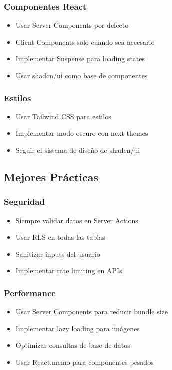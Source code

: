 \documentclass[12pt,a4paper]{article}
\begin{document}
\subsubsection{Componentes React}
\begin{itemize}
    \item Usar Server Components por defecto
    \item Client Components solo cuando sea necesario
    \item Implementar Suspense para loading states
    \item Usar shadcn/ui como base de componentes
\end{itemize}

\subsubsection{Estilos}
\begin{itemize}
    \item Usar Tailwind CSS para estilos
    \item Implementar modo oscuro con next-themes
    \item Seguir el sistema de diseño de shadcn/ui
\end{itemize}

\subsection{Mejores Prácticas}

\subsubsection{Seguridad}
\begin{itemize}
    \item Siempre validar datos en Server Actions
    \item Usar RLS en todas las tablas
    \item Sanitizar inputs del usuario
    \item Implementar rate limiting en APIs
\end{itemize}

\subsubsection{Performance}
\begin{itemize}
    \item Usar Server Components para reducir bundle size
    \item Implementar lazy loading para imágenes
    \item Optimizar consultas de base de datos
    \item Usar React.memo para componentes pesados
\end{itemize}
\end{document}
